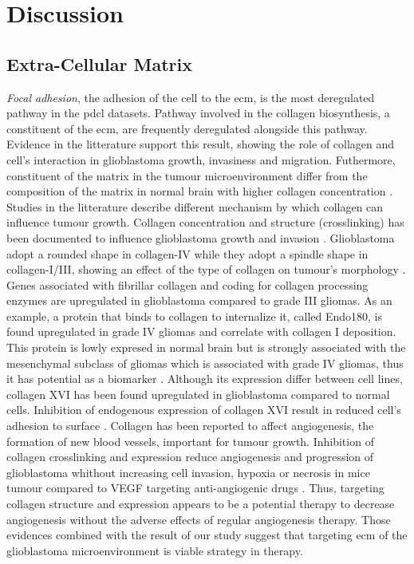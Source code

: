 \section{Discussion}

\subsection{Extra-Cellular Matrix}

\textit{Focal adhesion}, the adhesion of the cell to the \acrshort{ecm}, is the most deregulated pathway in the \acrshort{pdcl} datasets.
Pathway involved in the collagen biosynthesis, a constituent of the \acrshort{ecm}, are frequently deregulated alongside this pathway.
Evidence in the litterature support this result, showing the role of collagen and cell's interaction in glioblastoma growth, invasiness and migration.
Futhermore, constituent of the matrix in the tumour microenvironment differ from the composition of the matrix in normal brain with higher collagen concentration \cite*{Mammoto2013}.
Studies in the litterature describe different mechanism by which collagen can influence tumour growth.
Collagen concentration and structure (crosslinking) has been documented to influence glioblastoma growth and invasion \cite*{Kaphle2019,Kaufman2005,Rao2013}. 
Glioblastoma adopt a rounded shape in collagen-IV while they adopt a spindle shape in collagen-I/III, showing an effect of the type of collagen on tumour's morphology \cite*{Rao2013}.
Genes associated with fibrillar collagen and coding for collagen processing enzymes are upregulated in glioblastoma compared to grade III gliomas.
As an example, a protein that binds to collagen to internalize it, called Endo180, is found upregulated in grade IV gliomas and correlate with collagen I deposition. 
This protein is lowly expresed in normal brain but is strongly associated with the mesenchymal subclass of gliomas which is associated with grade IV gliomas, thus it has potential as a biomarker \cite*{Huijbers2010}.
Although its expression differ between cell lines, collagen XVI has been found upregulated in glioblastoma compared to normal cells.
Inhibition of endogenous expression of collagen XVI result in reduced cell's adhesion to surface \cite*{Senner2008}.
Collagen has been reported to affect angiogenesis, the formation of new blood vessels, important for tumour growth.
Inhibition of collagen crosslinking and expression reduce angiogenesis and progression of glioblastoma whithout increasing cell invasion, hypoxia or necrosis in mice tumour compared to VEGF targeting anti-angiogenic drugs \cite*{Mammoto2013}.
Thus, targeting collagen structure and expression appears to be a potential therapy to decrease angiogenesis without the adverse effects of regular angiogenesis therapy.
Those evidences combined with the result of our study suggest that targeting \acrshort{ecm} of the glioblastoma microenvironment is viable strategy in therapy.

